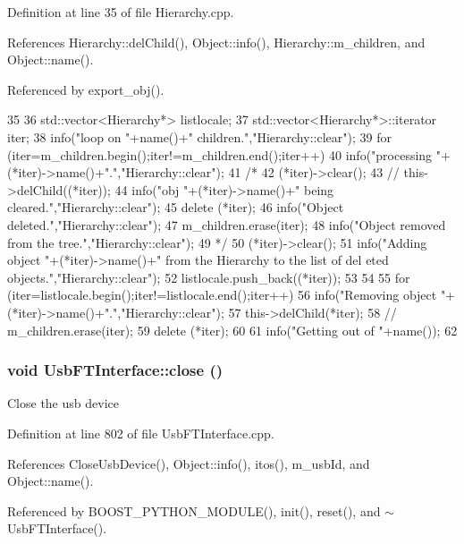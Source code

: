 Definition at line 35 of file Hierarchy.cpp.

References Hierarchy::delChild(), Object::info(), Hierarchy::m\_\-children, and Object::name().

Referenced by export\_\-obj().


\begin{DoxyCode}
35                      {
36   std::vector<Hierarchy*> listlocale;
37   std::vector<Hierarchy*>::iterator iter;
38   info("loop on "+name()+" children.","Hierarchy::clear");
39   for (iter=m_children.begin();iter!=m_children.end();iter++){
40       info("processing "+(*iter)->name()+".","Hierarchy::clear");
41 /*
42       (*iter)->clear();
43 //      this->delChild((*iter));
44       info("obj "+(*iter)->name()+" being cleared.","Hierarchy::clear");
45       delete (*iter);
46       info("Object deleted.","Hierarchy::clear");
47       m_children.erase(iter);
48       info("Object removed from the tree.","Hierarchy::clear");
49 */
50     (*iter)->clear();
51     info("Adding object "+(*iter)->name()+" from the Hierarchy to the list of del
      eted objects.","Hierarchy::clear");
52     listlocale.push_back((*iter));
53   }
54 
55   for (iter=listlocale.begin();iter!=listlocale.end();iter++){
56     info("Removing object "+(*iter)->name()+".","Hierarchy::clear");
57     this->delChild(*iter);
58 //    m_children.erase(iter);
59     delete (*iter);
60   }
61   info("Getting out of "+name());
62 }
\end{DoxyCode}
\hypertarget{classUsbFTInterface_ad555e20eb4b80da1d3cac5a8c6509bb5}{
\subsubsection[{close}]{\setlength{\rightskip}{0pt plus 5cm}void UsbFTInterface::close ()}}
\label{classUsbFTInterface_ad555e20eb4b80da1d3cac5a8c6509bb5}
Close the usb device 

Definition at line 802 of file UsbFTInterface.cpp.

References CloseUsbDevice(), Object::info(), itos(), m\_\-usbId, and Object::name().

Referenced by BOOST\_\-PYTHON\_\-MODULE(), init(), reset(), and $\sim$UsbFTInterface().


